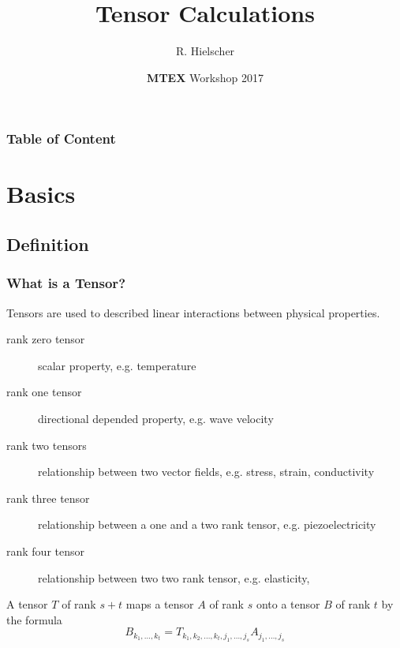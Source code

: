 \documentclass[compress]{beamer}
\author{R. Hielscher}
\title{Tensor Calculations}
\institute{Faculty of Mathematics,\\
	Chemnitz University of Technology, Germany}
\date{{\bf{\color{red}M}TEX} Workshop 2017}
\begin{document}
\begin{frame}
  \maketitle{}
\end{frame}


\begin{frame}
  \frametitle{Table of Content}

\tableofcontents{}

\end{frame}

\section{Basics}


\subsection*{Definition}

\begin{frame}
  \frametitle{What is a Tensor?}

  Tensors are used to described linear interactions between physical
  properties.

  \pause

  \begin{description}
    \item[rank zero tensor] scalar property, e.g. temperature
    \item[rank one tensor] directional depended property, e.g. wave velocity
    \item[rank two tensors] relationship between two vector fields,
    e.g. stress, strain, conductivity
    \item[rank three tensor] relationship between a one and a two rank tensor,
    e.g. piezoelectricity
    \item[rank four tensor] relationship between two two rank tensor, e.g. elasticity,
  \end{description}

  \pause

  A tensor $T$ of rank $s+t$ maps a tensor $A$ of rank $s$ onto a tensor $B$
  of rank $t$ by the formula
  \begin{equation*}
    B_{k_{1},\ldots,k_{t}}
    = T_{k_{1},k_{2},\ldots,k_{t},j_{1},\ldots,j_{s}} A_{j_{1},\ldots,j_{s}}
  \end{equation*}

\end{frame}
\end{document}
